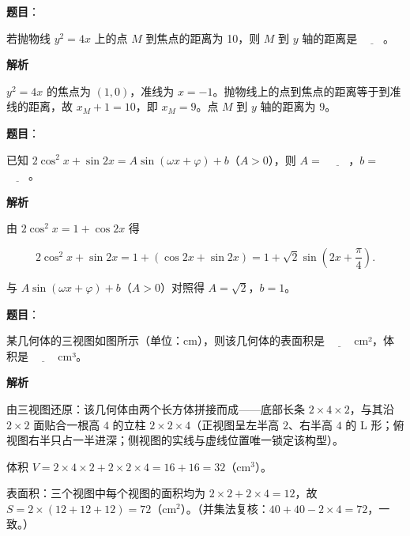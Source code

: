 \begin{answer}

\textbf{题目}：

若抛物线 \(y^{2}=4x\) 上的点 \(M\) 到焦点的距离为 10，则 \(M\) 到 \(y\) 轴的距离是 \(\underline{\qquad}\)。

\textbf{解析}

\(y^{2}=4x\) 的焦点为 \((1,0)\)，准线为 \(x=-1\)。抛物线上的点到焦点的距离等于到准线的距离，故 \(x_{M}+1=10\)，即 \(x_{M}=9\)。点 \(M\) 到 \(y\) 轴的距离为 \(9\)。


\end{answer}
\begin{answer}

\textbf{题目}：

已知 \(2\cos^{2}x+\sin 2x=A\sin(\omega x+\varphi)+b\)（\(A>0\)），则 \(A=\) \(\underline{\qquad}\)，\(b=\) \(\underline{\qquad}\)。

\textbf{解析}

由 \(2\cos^{2}x=1+\cos 2x\) 得

\nopagebreak[4]
\[
2\cos^{2}x+\sin 2x=1+(\cos 2x+\sin 2x)=1+\sqrt{2}\sin\left(2x+\dfrac{\pi}{4}\right).
\]

与 \(A\sin(\omega x+\varphi)+b\)（\(A>0\)）对照得 \(A=\sqrt{2}\)，\(b=1\)。


\end{answer}
\begin{answer}

\textbf{题目}：

某几何体的三视图如图所示（单位：cm），则该几何体的表面积是 \(\underline{\qquad}\) cm²，体积是 \(\underline{\qquad}\) cm³。
\nopagebreak[4]
\begin{center}\end{center}
\nopagebreak[4]
\textbf{解析}

由三视图还原：该几何体由两个长方体拼接而成——底部长条 \(2\times 4\times 2\)，与其沿 \(2\times 2\) 面贴合一根高 \(4\) 的立柱 \(2\times 2\times 4\)（正视图呈左半高 \(2\)、右半高 \(4\) 的 L 形；俯视图右半只占一半进深；侧视图的实线与虚线位置唯一锁定该构型）。

体积 \(V=2\times 4\times 2+2\times 2\times 4=16+16=32\)（\(\mathrm{cm}^{3}\)）。

表面积：三个视图中每个视图的面积均为 \(2\times 2+2\times 4=12\)，故 \(S=2\times(12+12+12)=72\)（\(\mathrm{cm}^{2}\)）。（并集法复核：\(40+40-2\times 4=72\)，一致。）


\end{answer}
